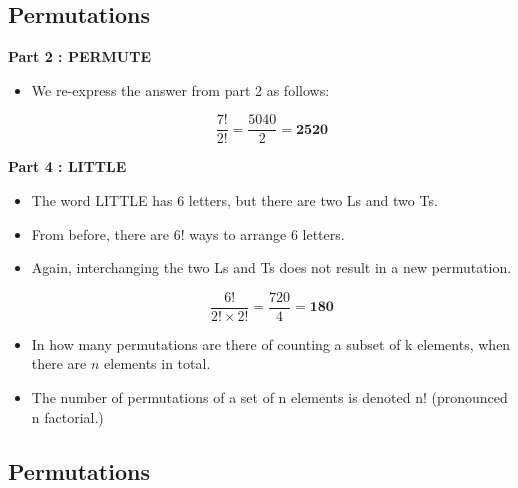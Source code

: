 %



\subsection{Permutations}


\textbf{Part 2 : PERMUTE}\\
\begin{itemize}
	\item We re-express the answer from part 2 as follows:
	
	\[\frac{7!}{2!} =  \frac{5040}{2} = \boldsymbol{2520} \]
\end{itemize}

\textbf{Part 4 : LITTLE}\\
\begin{itemize}
	\item The word LITTLE has 6 letters, but there are two Ls and two Ts.
	\item From before, there are 6! ways to arrange 6 letters.
	\item Again, interchanging the two Ls and Ts does not result in a new permutation. 
	
	\[\frac{6!}{2!\times 2!} =  \frac{720}{4} = \boldsymbol{180} \]
\end{itemize}

\begin{itemize}
	\item In how many permutations are there of counting a subset of k elements, when there are $n$ elements in total.
	
	\item The number of permutations of a set of n elements is denoted n! (pronounced n factorial.)
\end{itemize}

	\subsection{Permutations}
	
